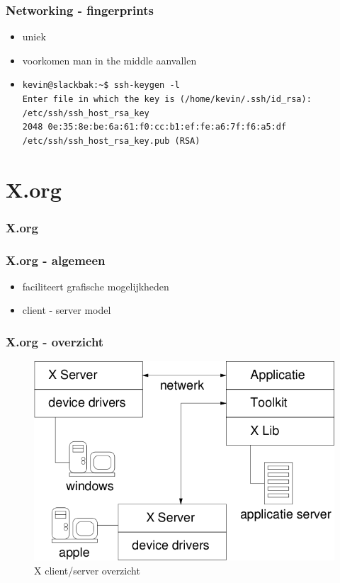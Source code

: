 \documentclass{beamer}
\begin{document}
\begin{frame}[fragile]
  \frametitle{Networking - fingerprints}
  \begin{itemize}
  \item<1-> uniek
  \item<2-> voorkomen man in the middle aanvallen
  \item<3-> 
    \begin{lstlisting}
kevin@slackbak:~$ ssh-keygen -l
Enter file in which the key is (/home/kevin/.ssh/id_rsa): /etc/ssh/ssh_host_rsa_key  
2048 0e:35:8e:be:6a:61:f0:cc:b1:ef:fe:a6:7f:f6:a5:df /etc/ssh/ssh_host_rsa_key.pub (RSA)
    \end{lstlisting}%
  \end{itemize}
\end{frame}

\section{X.org}

\begin{frame}
  \frametitle{X.org}
\end{frame}

\begin{frame}
  \frametitle{X.org - algemeen}
  \begin{itemize}
  \item<1-> faciliteert grafische mogelijkheden
  \item<2-> client - server model
  \end{itemize}
\end{frame}

\begin{frame}
  \frametitle{X.org - overzicht}
  \begin{figure}[h]
    \begin{center}
      \includegraphics[scale=0.3]{../../dictaat/images/xserver2}
    \end{center}
    \caption{X client/server overzicht}
    \label{fig:xs2}
  \end{figure}
\end{frame}
\end{document}
